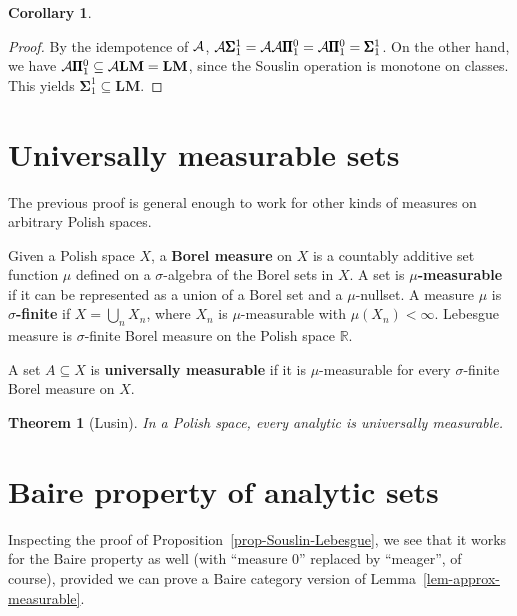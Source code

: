 \documentclass{article}
\newcommand{\bPi}{\pmb{\Pi}}
\newcommand{\bSigma}{\pmb{\Sigma}}
\newcommand{\PS}[1]{\bSigma^{1}_{#1}}
\newcommand{\Real}{\mathbb{R}}
\newcommand{\BP}[1]{\bPi^0_{#1}}
\newtheorem{theorem}{Theorem}[section]
\newtheorem{corollary}{Corollary}[theorem]
\begin{document}
\begin{corollary}
\end{corollary}\begin{proof}By the idempotence of ${\cal A}$, ${\cal A}\PS{1} = {\cal A}{\cal
  A}\BP{1} = {\cal A}\BP{1} = \PS{1}$. On the other hand, we have ${\cal A}\BP{1} \subseteq
{\cal A}\mathbf{LM} = \mathbf{LM}$, since the Souslin operation is monotone on
classes. This yields $\PS{1} \subseteq \mathbf{LM}$.

\end{proof}\section{Universally measurable sets}

The previous proof is general enough to work for other kinds of
measures on arbitrary Polish spaces.

Given a Polish space $X$, a \textbf{Borel measure} on $X$ is a
countably additive set function ${}\mu$ defined on a ${}\sigma$-algebra of the
Borel sets in $X$. A set is \textbf{${}\mu$-measurable} if it can be
represented as a union of a Borel set and a ${}\mu$-nullset. A measure ${}\mu$
is \textbf{${}\sigma$-finite} if $X = \bigcup_n X_n$, where $X_n$ is
${}\mu$-measurable with $\mu(X_n) < \infty$. Lebesgue
measure is ${}\sigma$-finite Borel measure on the Polish space $\Real$.

A set $A \subseteq X$ is \textbf{universally measurable} if it is
${}\mu$-measurable for every ${}\sigma$-finite Borel measure on $X$.

\begin{theorem}[Lusin]\label{thm-analytic-universally-measurable}In a Polish space, every analytic is universally measurable.

\end{theorem}\section{Baire property of analytic sets}

Inspecting the proof of Proposition~\ref{prop-Souslin-Lebesgue}, we
see that it works for the Baire property as well (with ``measure
0'' replaced by ``meager'', of course), provided we can
prove a Baire category version of Lemma~\ref{lem-approx-measurable}.
\end{document}

